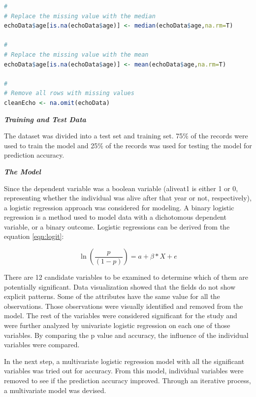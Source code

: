 \documentclass[11pt]{article}
\begin{document}
\begin{lstlisting}[language=R, label=DataCleanup, caption=Data Cleanup Methods, float, frame=tb]
#
# Replace the missing value with the median
echoData$age[is.na(echoData$age)] <- median(echoData$age,na.rm=T)

#
# Replace the missing value with the mean
echoData$age[is.na(echoData$age)] <- mean(echoData$age,na.rm=T)

#
# Remove all rows with missing values
cleanEcho <- na.omit(echoData)
\end{lstlisting}



{\textbf {\emph{Training and Test Data}}}

The dataset was divided into a test set and training set. 75\% of the records were used to train the model and 25\% of the records was used for testing the model for prediction accuracy.


{\textbf {\emph{The Model}}}

Since the dependent variable was a boolean variable (aliveat1 is either 1 or 0, representing whether the individual was alive after that year or not, respectively), a logistic regression approach was considered for modeling. A binary logistic regression is a method used to model data with a dichotomous dependent variable, or a binary outcome. Logistic regressions can be derived from the equation \ref{eqn:logit}:

\begin{equation}
\label{eqn:logit}
    \ln(\frac{p}{(1-p)}) = a + \beta * X + e
\end{equation}

There are 12 candidate variables to be examined to determine which of them are potentially significant. Data visualization showed that the fields do not show explicit patterns. Some of the attributes have the same value for all the observations. Those observations were visually identified and removed from the model. The rest of the variables were considered significant for the study and were further analyzed by univariate logistic regression on each one of those variables. By comparing the p value and accuracy, the influence of the individual variables were compared. 

In the next step, a multivariate logistic regression model with all the significant variables was tried out for accuracy. From this model, individual variables were removed to see if the prediction accuracy improved. Through an iterative process, a multivariate model was devised.
\end{document}
